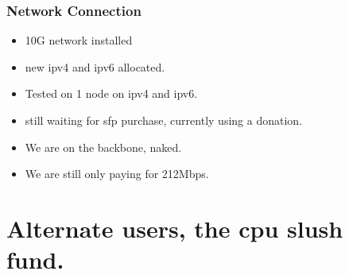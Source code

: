 \documentclass{beamer}
\begin{document}
\begin{frame}
  \frametitle{Network Connection}
\end{frame}

\begin{frame}
    \begin{itemize}
            \item 10G network installed
        \item new ipv4 and ipv6 allocated.
        \item  Tested on 1 node on ipv4 and ipv6.
                \item still waiting for sfp purchase, currently using a donation.
                    \item We are on the backbone, naked.
                        \item We are still only paying for 212Mbps.
    \end{itemize}
\end{frame}


\section{Alternate users, the cpu slush fund.}
\end{document}
